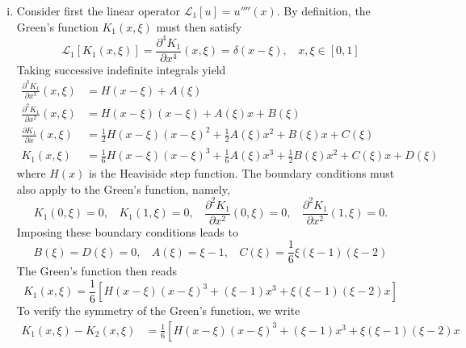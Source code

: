 \begin{enumerate}[(i)]
\item { %
    Consider first the linear operator $\mathcal{L}_1[u] = u''''(x)$. 
    By definition, the Green's function $K_1(x, \xi)$ must then satisfy 
    \begin{equation}
        \mathcal{L}_1[K_1(x, \xi)] = \frac{\partial^4 K_1}{\partial x^4}(x, \xi) = \delta(x - \xi), ~~~~ x, \xi \in [0, 1]
    \end{equation}
    Taking successive indefinite integrals yield 
    \begin{equation}
    \begin{aligned}
        \frac{\partial^3 K_1}{\partial x^3}(x, \xi) &= H(x - \xi) + A(\xi) \\
        \frac{\partial^2 K_1}{\partial x^2}(x, \xi) &= H(x - \xi)(x-\xi) + A(\xi)x + B(\xi) \\
        \frac{\partial K_1}{\partial x}(x, \xi) &= \frac{1}{2}H(x - \xi){(x-\xi)}^2 + \frac{1}{2}A(\xi)x^2 + B(\xi)x + C(\xi) \\
        K_1(x, \xi) &= \frac{1}{6}H(x - \xi){(x-\xi)}^3 + \frac{1}{6}A(\xi)x^3 + \frac{1}{2}B(\xi)x^2 + C(\xi)x + D(\xi)
    \end{aligned}
    \end{equation}
    where $H(x)$ is the Heaviside step function. 
    The boundary conditions must also apply to the Green's function, namely, 
    \begin{equation}\label{eqn:hw5_p1_bc}
        K_1(0, \xi) = 0, ~~~~ K_1(1, \xi) = 0, ~~~~ \frac{\partial^2 K_1}{\partial x^2}(0, \xi) = 0, ~~~~ \frac{\partial^2 K_1}{\partial x^2}(1, \xi) = 0.
    \end{equation}
    Imposing these boundary conditions leads to
    \begin{equation}
        B(\xi) = D(\xi) = 0, ~~~~ A(\xi) = \xi - 1, ~~~~ C(\xi) = \frac{1}{6}\xi(\xi-1)(\xi-2)
    \end{equation}
    The Green's function then reads 
    \begin{equation}
        \boxed{K_1(x, \xi) = \frac{1}{6}\left[ H(x - \xi){(x-\xi)}^3 + (\xi-1)x^3 + \xi(\xi-1)(\xi-2)x \right]}
    \end{equation}
    To verify the symmetry of the Green's function, we write 
    \begin{equation}
    \begin{aligned}
        K_1(x, \xi) - K_2(x, \xi) &= \frac{1}{6}\left[ H(x - \xi){(x-\xi)}^3 + (\xi-1)x^3 + \xi(\xi-1)(\xi-2)x \right. \\

\end{aligned}
\end{equation}}
\end{enumerate}
